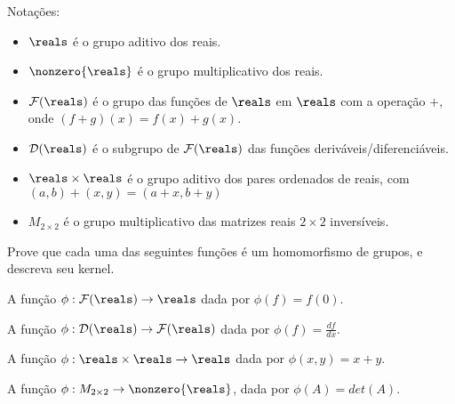 Notações:
\begin{itemize}
	\item $\reals$ é o grupo aditivo dos reais.
	
	\item $\nonzero{\reals}$ é o grupo multiplicativo dos reais.

	\item $\mathcal{F}(\reals)$ é o grupo das funções de $\reals$ em $\reals$ com a operação $+$, onde $(f + g)(x) = f(x) + g(x)$. 

	\item $\mathcal{D}(\reals)$ é o subgrupo de $\mathcal{F}(\reals)$ das funções deriváveis/diferenciáveis.

	\item $\reals \times \reals$ é o grupo aditivo dos pares ordenados de reais, com $(a, b) + (x, y) = (a + x, b + y)$

	\item $M_{2\times2}$ é o grupo multiplicativo das matrizes reais $2\times2$ inversíveis.
\end{itemize}

Prove que cada uma das seguintes funções é um homomorfismo de grupos, e descreva seu kernel.

\begin{exercise}
	A função $\phi : \mathcal{F}(\reals) \to \reals$ dada por $\phi(f) = f(0)$.
\end{exercise}

\begin{exercise}
	A função $\phi : \mathcal{D}(\reals) \to \mathcal{F}(\reals)$ dada por $\phi(f) = \frac{df}{dx}$.
\end{exercise}

\begin{exercise}
	A função $\phi : \reals \times \reals \to \reals$ dada por $\phi(x, y) = x + y$.
\end{exercise}

\begin{exercise}
	A função $\phi : M_{2\times2} \to \nonzero{\reals}$, dada por $\phi(A) = det(A)$.
\end{exercise}
